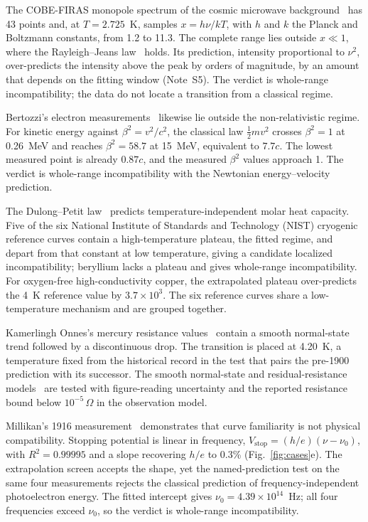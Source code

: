 \documentclass{article}
\begin{document}
The COBE-FIRAS monopole spectrum of the cosmic microwave background~\cite{fixsen1996firas} has 43 points and, at $T = 2.725$~K, samples $x = h\nu/kT$, with $h$ and $k$ the Planck and Boltzmann constants, from 1.2 to 11.3. The complete range lies outside $x \ll 1$, where the Rayleigh--Jeans law~\cite{rayleigh1900,jeans1905} holds. Its prediction, intensity proportional to $\nu^{2}$, over-predicts the intensity above the peak by orders of magnitude, by an amount that depends on the fitting window (Note~S5). The verdict is whole-range incompatibility; the data do not locate a transition from a classical regime.

Bertozzi's electron measurements~\cite{bertozzi1964} likewise lie outside the non-relativistic regime. For kinetic energy against $\beta^{2} = v^{2}/c^{2}$, the classical law $\tfrac{1}{2}mv^{2}$ crosses $\beta^{2} = 1$ at 0.26~MeV and reaches $\beta^{2} = 58.7$ at 15~MeV, equivalent to $7.7c$. The lowest measured point is already $0.87c$, and the measured $\beta^{2}$ values approach 1. The verdict is whole-range incompatibility with the Newtonian energy--velocity prediction.

The Dulong--Petit law~\cite{dulong1819} predicts temperature-independent molar heat capacity. Five of the six National Institute of Standards and Technology (NIST) cryogenic reference curves contain a high-temperature plateau, the fitted regime, and depart from that constant at low temperature, giving a candidate localized incompatibility; beryllium lacks a plateau and gives whole-range incompatibility. For oxygen-free high-conductivity copper, the extrapolated plateau over-predicts the 4~K reference value by $3.7\times10^{3}$. The six reference curves share a low-temperature mechanism and are grouped together.

Kamerlingh Onnes's mercury resistance values~\cite{onnes1911} contain a smooth normal-state trend followed by a discontinuous drop. The transition is placed at 4.20~K, a temperature fixed from the historical record in the test that pairs the pre-1900 prediction with its successor. The smooth normal-state and residual-resistance models~\cite{drude1900} are tested with figure-reading uncertainty and the reported resistance bound below $10^{-5}\,\Omega$ in the observation model.

Millikan's 1916 measurement~\cite{millikan1916} demonstrates that curve familiarity is not physical compatibility. Stopping potential is linear in frequency, $V_{\mathrm{stop}} = (h/e)(\nu - \nu_{0})$, with $R^{2} = 0.99995$ and a slope recovering $h/e$ to 0.3\% (Fig.~\ref{fig:cases}e). The extrapolation screen accepts the shape, yet the named-prediction test on the same four measurements rejects the classical prediction of frequency-independent photoelectron energy. The fitted intercept gives $\nu_{0} = 4.39\times10^{14}$~Hz; all four frequencies exceed $\nu_{0}$, so the verdict is whole-range incompatibility.
\end{document}
